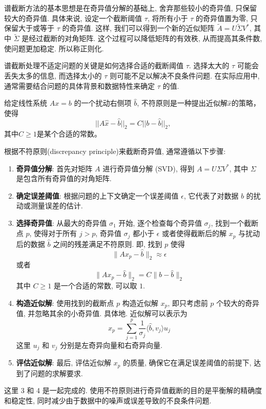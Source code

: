 \documentclass[a4paper]{ctexart}
\newcommand{\hl}[1]
{\noindent {\bf {#1}}}
\begin{document}
谱截断方法的基本思想是在奇异值分解的基础上, 舍弃那些较小的奇异值, 只保留较大的奇异值. 
具体来说, 设定一个截断阈值 $\tau$, 将所有小于 $\tau$ 的奇异值置为零, 
只保留大于或等于 $\tau$ 的奇异值. 这样, 我们可以得到一个新的近似矩阵 
$\tilde{A} = U\tilde{\Sigma} V^*$, 其中 $\tilde{\Sigma}$ 是经过截断的对角矩阵. 
这个过程可以降低矩阵的有效秩, 从而提高其条件数, 使问题更加稳定. 所以称正则化.

谱截断处理不适定问题的关键是如何选择合适的截断阈值 $\tau$. 
选择太大的 $\tau$ 可能会丢失太多的信息, 而选择太小的 $\tau$ 则可能不足以解决不良条件问题. 
在实际应用中, 通常需要结合问题的具体背景和数据特性来确定 $\tau$ 的值. 

\hl{定义5.64} 给定线性系统 $Ax = b$ 的一个扰动右侧项 $\hat{b}$, 
不符原则是一种提出近似解$\hat{x}$的策略，使得
\[ ||A\hat{x} - \hat{b}||_2 = C||b - \hat{b}||_2, \]
其中$C \geq 1$是某个合适的常数。

根据不符原则(discrepancy principle)来截断奇异值, 通常遵循以下步骤:

\begin{enumerate}
  \item {\bf 奇异值分解}: 首先对矩阵 $A$ 进行奇异值分解 (SVD), 
  得到 $A = U\Sigma V^*$, 其中 $\Sigma$ 是包含所有奇异值的对角矩阵. 
  \item {\bf 确定误差阈值}: 根据问题的上下文确定一个误差阈值 $\epsilon$, 
  它代表了对数据 $b$ 的扰动或测量误差的估计. 
  \item {\bf 选择奇异值}: 从最大的奇异值 $\sigma_1$ 开始, 
  逐个检查每个奇异值 $\sigma_j$, 找到一个截断点 $p$, 使得对于所有 $j > p$, 
  奇异值 $\sigma_j$ 都小于 $\epsilon$ 或者使得截断后的解 $x_p$ 与扰动后的数据
  $\hat{b}$ 之间的残差满足不符原则. 即, 找到 $p$ 使得
  \[ 
  \|A x_p - \hat{b}\|_2 \approx \epsilon 
  \]
  或者
  \[ 
  \|A x_p - \hat{b}\|_2 = C \|b - \hat{b}\|_2 
  \]
  其中 $C \geq 1$ 是一个合适的常数, 可以取 $1$.
  \item {\bf 构造近似解}: 使用找到的截断点 $p$ 构造近似解 $x_p$, 
  即只考虑前 $p$ 个较大的奇异值, 并忽略其余的小奇异值. 具体地. 近似解可以表示为
  \[ 
  x_p = \sum_{j=1}^{p} \frac{1}{\sigma_j} \langle \hat{b}, v_j \rangle u_j 
  \]
  这里 $u_j$ 和 $v_j$ 分别是左奇异向量和右奇异向量.
  \item {\bf 评估近似解}: 最后, 评估近似解 $x_p$ 的质量, 确保它在满足误差阈值的前提下, 
  达到了问题的求解要求.
\end{enumerate}

这里 3 和 4 是一起完成的. 使用不符原则进行奇异值截断的目的是平衡解的精确度和稳定性, 
同时减少由于数据中的噪声或误差导致的不良条件问题. 
\end{document}
